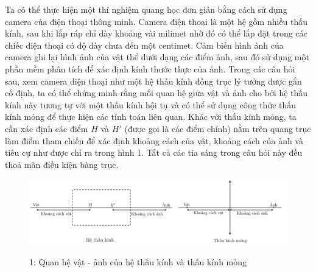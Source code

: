 \noindent Ta có thể thực hiện một thí nghiệm quang học đơn giản bằng cách sử dụng camera của điện thoại thông minh. Camera điện thoại là một hệ gồm nhiều thấu kính, sau khi lắp ráp chỉ dày khoảng vài milimet nhờ đó có thể lắp đặt trong các chiếc điện thoại có độ dày chưa đến một centimet. Cảm biến hình ảnh của camera ghi lại hình ảnh của vật thể dưới dạng các điểm ảnh, sau đó sử dụng một phần mềm phân tích để xác định kính thước thực của ảnh. Trong các câu hỏi sau, xem camera điện thoại như một hệ thấu kính đồng trục lý tưởng được gắn cố định, ta có thể chứng minh rằng mối quan hệ giữa vật và ảnh cho bởi hệ thấu kính này tương tự với một thấu kính hội tụ và có thể sử dụng công thức thấu kính mỏng để thực hiện các tính toán liên quan. Khác với thấu kính mỏng, ta cần xác định các điểm $H$ và $H'$ (được gọi là các điểm chính) nằm trên quang trục làm điểm tham chiếu để xác định khoảng cách của vật, khoảng cách của ảnh và tiêu cự như được chỉ ra trong hình 1. Tất cả các tia sáng trong câu hỏi này đều thoả mãn điều kiện bàng trục.\\

\begin{figure}[h]
  \centering
  \includegraphics[width=1\textwidth]{images/Hinh 1.PNG}
  \begin{center}
    \figurename{ 1: Quan hệ vật - ảnh của hệ thấu kính và thấu kính mỏng}
  \end{center}
\end{figure}

